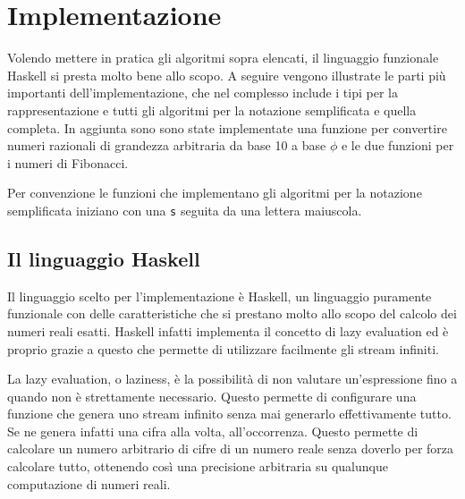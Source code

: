 \documentclass[Lau,oneside]{sapthesis}
\newcommand{\code}[1]{\colorbox{light-gray}{\texttt{#1}}}
\begin{document}
\chapter{Implementazione}
Volendo mettere in pratica gli algoritmi sopra elencati, il linguaggio funzionale Haskell si presta molto bene allo scopo. A seguire vengono illustrate le parti più importanti dell'implementazione, che nel complesso include i tipi per la rappresentazione e tutti gli algoritmi per la notazione semplificata e quella completa. In aggiunta sono sono state implementate una funzione per convertire numeri razionali di grandezza arbitraria da base 10 a base $\phi$ e le due funzioni per i numeri di Fibonacci.

Per convenzione le funzioni che implementano gli algoritmi per la notazione semplificata iniziano con una \code{s} seguita da una lettera maiuscola.


\section{Il linguaggio Haskell}
Il linguaggio scelto per l'implementazione è Haskell, un linguaggio puramente funzionale con delle caratteristiche che si prestano molto allo scopo del calcolo dei numeri reali esatti. Haskell infatti implementa il concetto di lazy evaluation ed è proprio grazie a questo che permette di utilizzare facilmente gli stream infiniti.

La lazy evaluation, o laziness, è la possibilità di non valutare un'espressione fino a quando non è strettamente necessario. Questo permette di configurare una funzione che genera uno stream infinito senza mai generarlo effettivamente tutto. Se ne genera infatti una cifra alla volta, all'occorrenza. Questo permette di calcolare un numero arbitrario di cifre di un numero reale senza doverlo per forza calcolare tutto, ottenendo così una precisione arbitraria su qualunque computazione di numeri reali.
\end{document}
